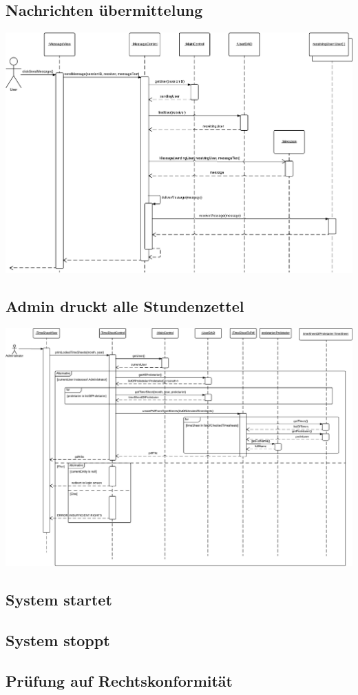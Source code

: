     \subsection{Nachrichten übermittelung}
        \includegraphics[width=\linewidth]{"Diagramms/sequenzes/message_delivery.pdf"}\\
    \subsection{Admin druckt alle Stundenzettel}
        \includegraphics[width=\linewidth]{"Diagramms/sequenzes/admin_prints_timesheets.pdf"}\\
    \subsection{System startet}
    \subsection{System stoppt}
    \subsection{Prüfung auf Rechtskonformität}